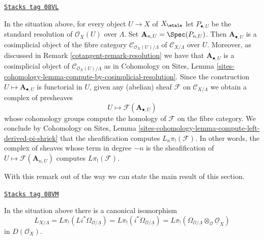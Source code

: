 \begin{remark}
\label{cotangent-remark-compute-L-pi-shriek-spaces}
\href{https://stacks.math.columbia.edu/tag/08VL}{\texttt{Stacks tag 08VL}}

In the situation above, for every object $U \to X$ of $X_\etale$
let $P_{\bullet, U}$ be the standard resolution of $\mathcal{O}_X(U)$
over $\Lambda$. Set $\mathbf{A}_{n, U} = \Spec(P_{n, U})$.
Then $\mathbf{A}_{\bullet, U}$
is a cosimplicial object of the fibre category
$\mathcal{C}_{\mathcal{O}_X(U)/\Lambda}$ of
$\mathcal{C}_{X/\Lambda}$ over $U$. Moreover, as discussed
in Remark \ref{cotangent-remark-resolution} we have that $\mathbf{A}_{\bullet, U}$
is a cosimplicial object of $\mathcal{C}_{\mathcal{O}_X(U)/\Lambda}$
as in Cohomology on Sites, Lemma
\ref{sites-cohomology-lemma-compute-by-cosimplicial-resolution}.
Since the construction $U \mapsto \mathbf{A}_{\bullet, U}$ is functorial
in $U$, given any (abelian) sheaf $\mathcal{F}$ on $\mathcal{C}_{X/\Lambda}$
we obtain a complex of presheaves
$$
U \longmapsto \mathcal{F}(\mathbf{A}_{\bullet, U})
$$
whose cohomology groups compute the homology of $\mathcal{F}$ on the fibre
category. We conclude by
Cohomology on Sites, Lemma
\ref{sites-cohomology-lemma-compute-left-derived-pi-shriek}
that the sheafification computes $L_n\pi_!(\mathcal{F})$.
In other words, the complex of sheaves whose term in degree $-n$ is
the sheafification of $U \mapsto \mathcal{F}(\mathbf{A}_{n, U})$ computes
$L\pi_!(\mathcal{F})$.
\end{remark}

With this remark out of the way we can state the main
result of this section.

\begin{lemma}
\label{cotangent-lemma-cotangent-morphism-spaces}
\href{https://stacks.math.columbia.edu/tag/08VM}{\texttt{Stacks tag 08VM}}

In the situation above there is a canonical isomorphism
$$
L_{X/\Lambda} =
L\pi_!(Li^*\Omega_{\mathcal{O}/\underline{\Lambda}}) =
L\pi_!(i^*\Omega_{\mathcal{O}/\underline{\Lambda}}) =
L\pi_!(\Omega_{\mathcal{O}/\underline{\Lambda}}
\otimes_\mathcal{O} \underline{\mathcal{O}}_X)
$$
in $D(\mathcal{O}_X)$.
\end{lemma}

